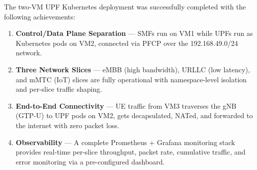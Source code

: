 \documentclass[12pt,a4paper]{article}
\begin{document}
The two-VM UPF Kubernetes deployment was successfully completed with the following achievements:

\begin{enumerate}
    \item \textbf{Control/Data Plane Separation} — SMFs run on VM1 while UPFs run as Kubernetes pods on VM2, connected via PFCP over the 192.168.49.0/24 network.
    \item \textbf{Three Network Slices} — eMBB (high bandwidth), URLLC (low latency), and mMTC (IoT) slices are fully operational with namespace-level isolation and per-slice traffic shaping.
    \item \textbf{End-to-End Connectivity} — UE traffic from VM3 traverses the gNB (GTP-U) to UPF pods on VM2, gets decapsulated, NATed, and forwarded to the internet with zero packet loss.
    \item \textbf{Observability} — A complete Prometheus + Grafana monitoring stack provides real-time per-slice throughput, packet rate, cumulative traffic, and error monitoring via a pre-configured dashboard.
\end{enumerate}
\end{document}
